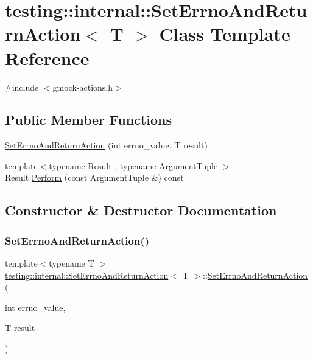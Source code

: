 \hypertarget{classtesting_1_1internal_1_1_set_errno_and_return_action}{}\section{testing\+:\+:internal\+:\+:Set\+Errno\+And\+Return\+Action$<$ T $>$ Class Template Reference}
\label{classtesting_1_1internal_1_1_set_errno_and_return_action}


{\ttfamily \#include $<$gmock-\/actions.\+h$>$}

\subsection*{Public Member Functions}
\begin{DoxyCompactItemize}
\item 
\hyperlink{classtesting_1_1internal_1_1_set_errno_and_return_action_abfe5a194a9b8f2b303c635ad99b3a257}{Set\+Errno\+And\+Return\+Action} (int errno\+\_\+value, T result)
\item 
{\footnotesize template$<$typename Result , typename Argument\+Tuple $>$ }\\Result \hyperlink{classtesting_1_1internal_1_1_set_errno_and_return_action_a44025d0d124cab72878bf6bdb12c3693}{Perform} (const Argument\+Tuple \&) const
\end{DoxyCompactItemize}


\subsection{Constructor \& Destructor Documentation}
\mbox{\label{classtesting_1_1internal_1_1_set_errno_and_return_action_abfe5a194a9b8f2b303c635ad99b3a257}} 
\subsubsection{\texorpdfstring{Set\+Errno\+And\+Return\+Action()}{SetErrnoAndReturnAction()}}
{\footnotesize\ttfamily template$<$typename T $>$ \\
\hyperlink{classtesting_1_1internal_1_1_set_errno_and_return_action}{testing\+::internal\+::\+Set\+Errno\+And\+Return\+Action}$<$ T $>$\+::\hyperlink{classtesting_1_1internal_1_1_set_errno_and_return_action}{Set\+Errno\+And\+Return\+Action} (\begin{DoxyParamCaption}\item[{int}]{errno\+\_\+value,  }\item[{T}]{result }\end{DoxyParamCaption})\hspace{0.3cm}{\ttfamily [inline]}}




